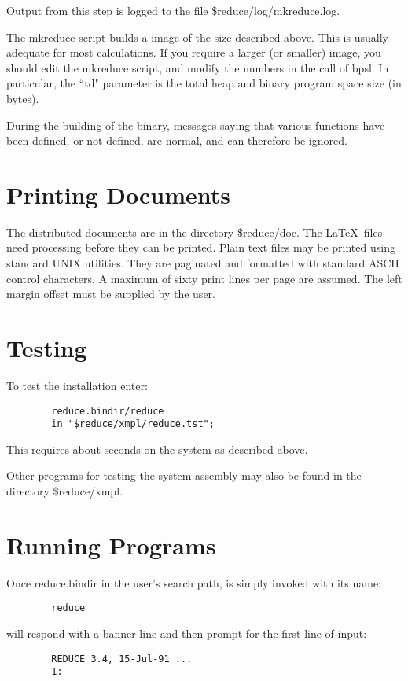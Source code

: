 Output from this step is logged to the file \$reduce/log/mkreduce.log.

The mkreduce script builds a {\REDUCE} image of the size described above.
This is usually adequate for most calculations.  If you require a larger
(or smaller) image, you should edit the mkreduce script, and modify the
numbers in the call of bpsl.  In particular, the ``td" parameter is the
total heap and binary program space size (in bytes).

During the building of the {\REDUCE} binary, messages saying that various
functions have been defined, or not defined, are normal, and can therefore
be ignored.

\section{Printing Documents}
The distributed documents are in the directory \$reduce/doc.  The
\LaTeX\ files need processing before they can be printed.  Plain text
files may be printed using standard UNIX utilities.  They are paginated
and formatted with standard ASCII control characters.  A maximum of sixty
print lines per page are assumed.  The left margin offset must be supplied
by the user.

\section{Testing {\REDUCE}}
To test the {\REDUCE} installation enter:
\begin{verbatim}
        reduce.bindir/reduce
        in "$reduce/xmpl/reduce.tst";
\end{verbatim}

This requires about {\testtime} seconds on the system as described above.

Other programs for testing the {\REDUCE} system assembly may also be found
in the directory \$reduce/xmpl.

\section{Running {\REDUCE} Programs}
Once reduce.bindir in the user's search path, {\REDUCE} is simply invoked
with its name:
\begin{verbatim}
        reduce
\end{verbatim}
{\REDUCE} will respond with a banner line and then prompt for the first
line of input:
\begin{verbatim}
        REDUCE 3.4, 15-Jul-91 ...
        1:
\end{verbatim}

